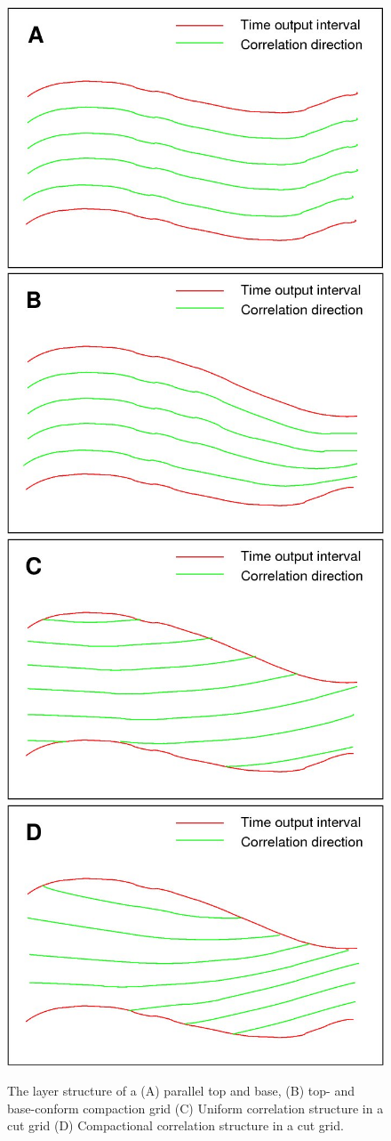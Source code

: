 
\begin{figure}
  \includegraphics[width=.49\linewidth]{images/A_correlation_parallel}
  \includegraphics[width=.49\linewidth]{images/B_correlation_proportional}\\
  \includegraphics[width=.49\linewidth]{images/C_correlation_parallel_timecut}
  \includegraphics[width=.49\linewidth]{images/D_correlation_proportional_timecut}
  \caption{The layer structure of a (A) parallel top and base,
           (B) top- and base-conform compaction grid (C) Uniform correlation
           structure in a cut grid (D) Compactional correlation structure in a
           cut grid.} 
  \label{fig:inversion-interval-types}
\end{figure}

